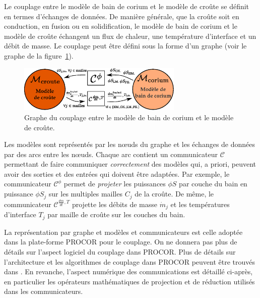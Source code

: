 Le couplage entre le modèle de bain de corium et le modèle de croûte se définit en termes d'échanges de données. De manière générale, que la croûte soit en conduction, en fusion ou en solidification, le modèle de bain de corium et le modèle de croûte échangent un flux de chaleur, une température d'interface et un débit de masse. Le couplage peut être défini sous la forme d'un graphe (voir le graphe de la figure~\ref{fig:graphe_couplage_corium_croute}). 
\begin{figure}
\centering
\includegraphics[width=0.7\textwidth, keepaspectratio=true]{Figures/graphe_couplage_corium_croute.eps}
\caption{Graphe du couplage entre le modèle de bain de corium et le modèle de croûte.}
\label{fig:graphe_couplage_corium_croute}
\end{figure}
Les modèles sont représentés par les n\oe{}uds du graphe et les échanges de données par des arcs entre les n\oe{}uds. Chaque arc contient un communicateur $\mathcal{C}$ permettant de faire communiquer \emph{correctement} des modèles qui, a priori, peuvent avoir des sorties et des entrées qui doivent être adaptées. Par exemple, le communicateur $\mathcal{C}^{\phi}$ permet de \emph{projeter} les puissances $\phi S$ par couche du bain en puissance $\phi S_j$ sur les multiples mailles $C_j$ de la croûte. De même, le communicateur $\mathcal{C}^{\frac{dm}{dt}, T}$ projette les débits de masse $\dot{m}_j$ et les températures d'interface $T_j$ par maille de croûte sur les couches du bain. 

La représentation par graphe et modèles et communicateurs est celle adoptée dans la plate-forme PROCOR pour le couplage. On ne donnera pas plus de détails sur l'aspect logiciel du couplage dans PROCOR. Plus de détails sur l'architecture et les algorithmes de couplage dans PROCOR peuvent être trouvés dans \cite{Viot2018}. En revanche, l'aspect numérique des communications est détaillé ci-après, en particulier les opérateurs mathématiques de projection et de réduction utilisés dans les communicateurs.

